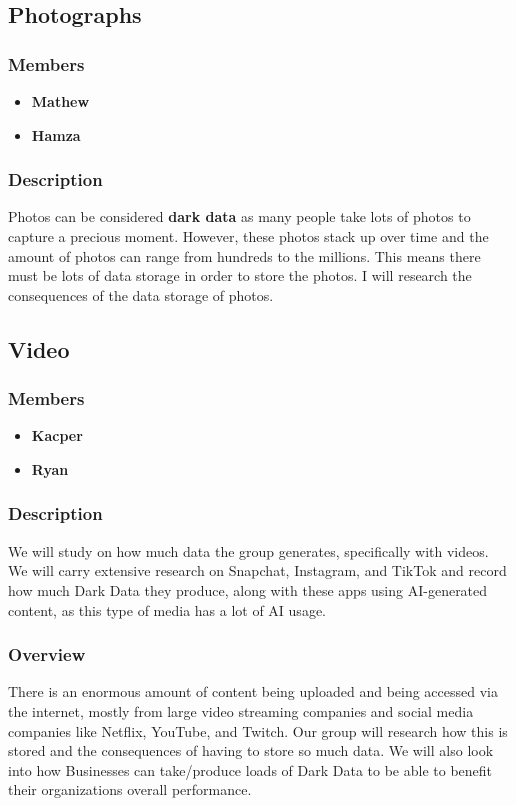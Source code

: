 \documentclass{article}
\begin{document}
    \subsection{Photographs}
        \subsubsection{Members}
        \begin{itemize}
            \item \textbf{Mathew}
            \item \textbf{Hamza}
        \end{itemize}
        \subsubsection{Description}
        Photos can be considered \textbf{dark data} as many people take lots of photos to capture a precious moment. However, these photos stack up over time and the amount of photos can range from hundreds to the millions. This means there must be lots of data storage in order to store the photos.
        I will research the consequences of the data storage of photos.

    \subsection{Video}
        \subsubsection{Members}
        \begin{itemize}
            \item \textbf{Kacper}
            \item \textbf{Ryan}
        \end{itemize}
        \subsubsection{Description}
        We will study on how much data the group generates, specifically with videos. We will carry extensive research on Snapchat, Instagram, and TikTok and record how much Dark Data they produce, along with these apps using AI-generated content, as this type of media has a lot of AI usage.

        \subsubsection{Overview}
        There is an enormous amount of content being uploaded and being accessed via the internet, mostly from large video 
        streaming companies and social media companies like Netflix, YouTube, and Twitch. Our group will research
        how this is stored and the consequences of having to store so much data. We will also look into how Businesses can
        take/produce loads of Dark Data to be able to benefit their organizations overall performance.
\end{document}
